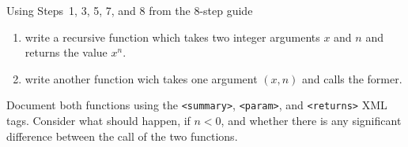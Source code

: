 Using Steps~1, 3, 5, 7, and 8 from the 8-step guide
\begin{enumerate}
\item write a recursive function which takes two integer arguments $x$ and $n$ and returns the value $x^n$.
\item write another function wich takes one argument $(x,n)$ and calls the former. 
\end{enumerate}
Document both functions using the \verb|<summary>|, \verb|<param>|, and \verb|<returns>| XML tags. Consider what should happen, if $n<0$, and whether there is any significant difference between the call of the two functions.
